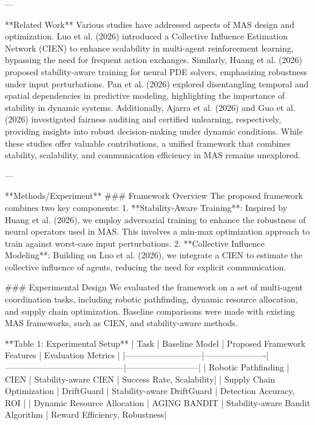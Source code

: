 ---

**Related Work**  
Various studies have addressed aspects of MAS design and optimization. Luo et al. (2026) introduced a Collective Influence Estimation Network (CIEN) to enhance scalability in multi-agent reinforcement learning, bypassing the need for frequent action exchanges. Similarly, Huang et al. (2026) proposed stability-aware training for neural PDE solvers, emphasizing robustness under input perturbations. Pan et al. (2026) explored disentangling temporal and spatial dependencies in predictive modeling, highlighting the importance of stability in dynamic systems. Additionally, Ajarra et al. (2026) and Guo et al. (2026) investigated fairness auditing and certified unlearning, respectively, providing insights into robust decision-making under dynamic conditions. While these studies offer valuable contributions, a unified framework that combines stability, scalability, and communication efficiency in MAS remains unexplored.

---

**Methods/Experiment**  
### Framework Overview  
The proposed framework combines two key components:
1. **Stability-Aware Training**: Inspired by Huang et al. (2026), we employ adversarial training to enhance the robustness of neural operators used in MAS. This involves a min-max optimization approach to train against worst-case input perturbations.
2. **Collective Influence Modeling**: Building on Luo et al. (2026), we integrate a CIEN to estimate the collective influence of agents, reducing the need for explicit communication.

### Experimental Design  
We evaluated the framework on a set of multi-agent coordination tasks, including robotic pathfinding, dynamic resource allocation, and supply chain optimization. Baseline comparisons were made with existing MAS frameworks, such as CIEN, and stability-aware methods.

**Table 1: Experimental Setup**  
| Task                     | Baseline Model       | Proposed Framework Features             | Evaluation Metrics       |
|---------------------------|----------------------|------------------------------------------|--------------------------|
| Robotic Pathfinding       | CIEN                | Stability-aware CIEN                     | Success Rate, Scalability|
| Supply Chain Optimization | DriftGuard          | Stability-aware DriftGuard               | Detection Accuracy, ROI  |
| Dynamic Resource Allocation | AGING BANDIT       | Stability-aware Bandit Algorithm         | Reward Efficiency, Robustness|

